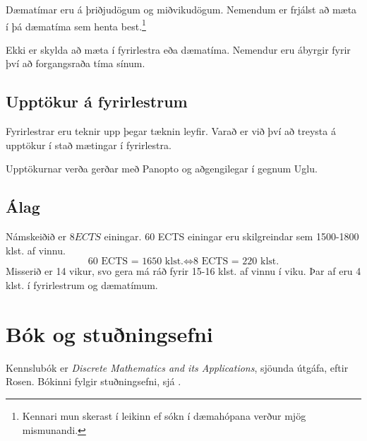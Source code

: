 \documentclass[justified, nobib]{tufte-handout}
\begin{document}
Dæmatímar eru á þriðjudögum og miðvikudögum. Nemendum er frjálst að mæta í þá dæmatíma sem henta best.\footnote{Kennari mun skerast í leikinn ef sókn í dæmahópana verður mjög mismunandi.}

Ekki er skylda að mæta í fyrirlestra eða dæmatíma. Nemendur eru ábyrgir fyrir því að forgangsraða tíma sínum.
\subsection{Upptökur á fyrirlestrum}
Fyrirlestrar eru teknir upp þegar tæknin leyfir. Varað er við því að treysta á upptökur í stað mætingar í fyrirlestra.

Upptökurnar verða gerðar með Panopto og aðgengilegar í gegnum Uglu.
\subsection{Álag}
Námskeiðið er $8 ECTS$ einingar. 60 ECTS einingar eru skilgreindar sem 1500-1800 klst. af vinnu.
\[
    \text{60 ECTS = 1650 klst.} \Longleftrightarrow \text{8 ECTS = 220 klst.}
\]
Misserið er 14 vikur, svo gera má ráð fyrir 15-16 klst. af vinnu í viku. Þar af eru 4 klst. í fyrirlestrum og dæmatímum.
\section[Bók]{Bók og stuðningsefni}
\label{sec:book}
Kennslubók er \emph{Discrete Mathematics and its Applications}, sjöunda útgáfa, eftir Rosen. Bókinni fylgir stuðningsefni, sjá .
\end{document}
